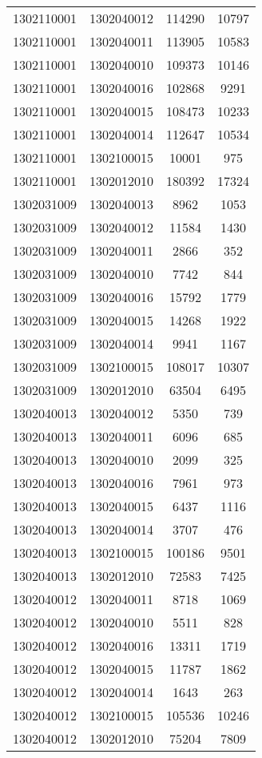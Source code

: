 \begin{longtable}[h]{llcc}
		1302110001 & 1302040012 & 114290 & 10797\\
		1302110001 & 1302040011 & 113905 & 10583\\
		1302110001 & 1302040010 & 109373 & 10146\\
		1302110001 & 1302040016 & 102868 & 9291\\
		1302110001 & 1302040015 & 108473 & 10233\\
		1302110001 & 1302040014 & 112647 & 10534\\
		1302110001 & 1302100015 & 10001 & 975\\
		1302110001 & 1302012010 & 180392 & 17324\\
		1302031009 & 1302040013 & 8962 & 1053\\
		1302031009 & 1302040012 & 11584 & 1430\\
		1302031009 & 1302040011 & 2866 & 352\\
		1302031009 & 1302040010 & 7742 & 844\\
		1302031009 & 1302040016 & 15792 & 1779\\
		1302031009 & 1302040015 & 14268 & 1922\\
		1302031009 & 1302040014 & 9941 & 1167\\
		1302031009 & 1302100015 & 108017 & 10307\\
		1302031009 & 1302012010 & 63504 & 6495\\
		1302040013 & 1302040012 & 5350 & 739\\
		1302040013 & 1302040011 & 6096 & 685\\
		1302040013 & 1302040010 & 2099 & 325\\
		1302040013 & 1302040016 & 7961 & 973\\
		1302040013 & 1302040015 & 6437 & 1116\\
		1302040013 & 1302040014 & 3707 & 476\\
		1302040013 & 1302100015 & 100186 & 9501\\
		1302040013 & 1302012010 & 72583 & 7425\\
		1302040012 & 1302040011 & 8718 & 1069\\
		1302040012 & 1302040010 & 5511 & 828\\
		1302040012 & 1302040016 & 13311 & 1719\\
		1302040012 & 1302040015 & 11787 & 1862\\
		1302040012 & 1302040014 & 1643 & 263\\
		1302040012 & 1302100015 & 105536 & 10246\\
		1302040012 & 1302012010 & 75204 & 7809\\

\end{longtable}
